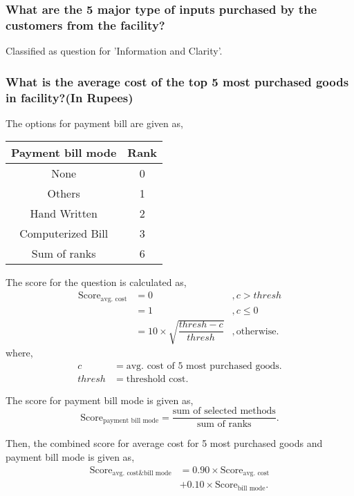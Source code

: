 \documentclass[oneside,twocolumn]{article}
\newcommand{\tsub}[2]{\text{#1}_{\text{#2}}}
\newcommand{\dsub}[2]{\dfrac{\text{#1}}{\text{#2}}}
\newenvironment{ttable}
               {
                 \begin{center}
                   \begin{tabular}{c|c}
                     \hline
               }
               {
                 \\ \hline
                   \end{tabular}
                 \end{center}
               }
\begin{document}
               \subsubsection{What are the 5 major type of inputs purchased by the customers from the facility?}
               Classified as question for 'Information and Clarity'.

               \subsubsection{What is the average cost of the top 5 most purchased goods in facility?(In Rupees)}
               The options for payment bill are given as,
               \begin{ttable}
                 Payment bill mode & Rank \\ \hline
                 None & 0 \\
                 Others & 1 \\
                 Hand Written & 2 \\
                 Computerized Bill & 3 \\ \hline
                 Sum of ranks & 6
               \end{ttable}
               
               The score for the question is calculated as,
               \begin{align*}
                 \tsub{Score}{avg. cost} &= 0 &, c > thresh \\
                 &= 1 &, c \le 0 \\
                 &= 10 \times \sqrt{\dfrac{thresh - c}{thresh}} &, \text{otherwise}.
               \end{align*}
               where,
               \begin{align*}
                 c &= \text{avg. cost of 5 most purchased goods}. \\
                 thresh &= \text{threshold cost}.
               \end{align*}

               The score for payment bill mode is given as,
               \[
               \tsub{Score}{payment bill mode} = \dsub{sum of selected methods}{sum of ranks}.
               \]

               Then, the combined score for average cost for 5 most purchased goods and
               payment bill mode is given as,
               \begin{align*}
                 \tsub{Score}{avg. cost\&bill mode} &= 0.90 \times \tsub{Score}{avg. cost} \\
                 &+ 0.10 \times \tsub{Score}{bill mode}.
               \end{align*}
\end{document}
